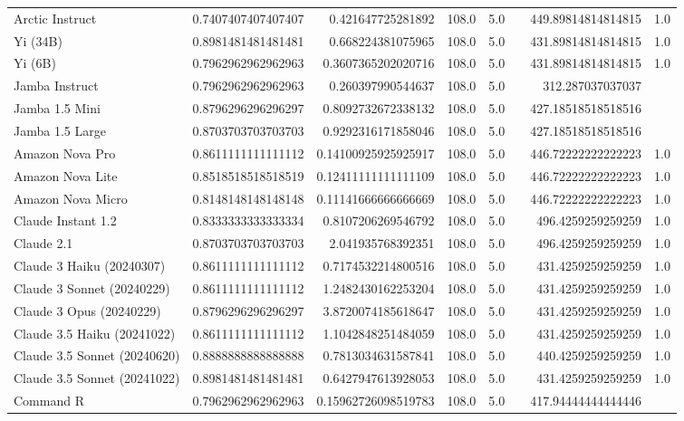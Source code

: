 \begin{table}[htp]
{\begin{tabular}{lrrrrrrr}
Arctic Instruct & 0.7407407407407407 & 0.421647725281892 & 108.0 & 5.0 &  & 449.89814814814815 & 1.0 \\
Yi (34B) & 0.8981481481481481 & 0.668224381075965 & 108.0 & 5.0 &  & 431.89814814814815 & 1.0 \\
Yi (6B) & 0.7962962962962963 & 0.3607365202020716 & 108.0 & 5.0 &  & 431.89814814814815 & 1.0 \\
Jamba Instruct & 0.7962962962962963 & 0.260397990544637 & 108.0 & 5.0 &  & 312.287037037037 &  \\
Jamba 1.5 Mini & 0.8796296296296297 & 0.8092732672338132 & 108.0 & 5.0 &  & 427.18518518518516 &  \\
Jamba 1.5 Large & 0.8703703703703703 & 0.9292316171858046 & 108.0 & 5.0 &  & 427.18518518518516 &  \\
Amazon Nova Pro & 0.8611111111111112 & 0.14100925925925917 & 108.0 & 5.0 &  & 446.72222222222223 & 1.0 \\
Amazon Nova Lite & 0.8518518518518519 & 0.12411111111111109 & 108.0 & 5.0 &  & 446.72222222222223 & 1.0 \\
Amazon Nova Micro & 0.8148148148148148 & 0.11141666666666669 & 108.0 & 5.0 &  & 446.72222222222223 & 1.0 \\
Claude Instant 1.2 & 0.8333333333333334 & 0.8107206269546792 & 108.0 & 5.0 &  & 496.4259259259259 & 1.0 \\
Claude 2.1 & 0.8703703703703703 & 2.041935768392351 & 108.0 & 5.0 &  & 496.4259259259259 & 1.0 \\
Claude 3 Haiku (20240307) & 0.8611111111111112 & 0.7174532214800516 & 108.0 & 5.0 &  & 431.4259259259259 & 1.0 \\
Claude 3 Sonnet (20240229) & 0.8611111111111112 & 1.2482430162253204 & 108.0 & 5.0 &  & 431.4259259259259 & 1.0 \\
Claude 3 Opus (20240229) & 0.8796296296296297 & 3.8720074185618647 & 108.0 & 5.0 &  & 431.4259259259259 & 1.0 \\
Claude 3.5 Haiku (20241022) & 0.8611111111111112 & 1.1042848251484059 & 108.0 & 5.0 &  & 431.4259259259259 & 1.0 \\
Claude 3.5 Sonnet (20240620) & 0.8888888888888888 & 0.7813034631587841 & 108.0 & 5.0 &  & 440.4259259259259 & 1.0 \\
Claude 3.5 Sonnet (20241022) & 0.8981481481481481 & 0.6427947613928053 & 108.0 & 5.0 &  & 431.4259259259259 & 1.0 \\
Command R & 0.7962962962962963 & 0.15962726098519783 & 108.0 & 5.0 &  & 417.94444444444446 &  \\

\end{tabular}}
\end{table}
